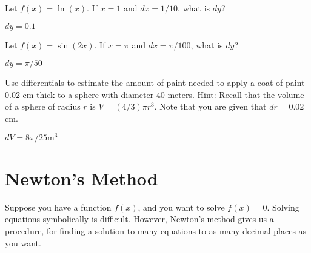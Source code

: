 \begin{exercises}
\begin{exercise} 
Let $f(x) = \ln(x)$. If $x=1$ and $dx =1/10$, what is $dy$?
\begin{answer} $dy=0.1$
\end{answer}\end{exercise}


\begin{exercise} 
Let $f(x) = \sin (2x)$. If $x=\pi$ and $dx=\pi/100$, what is $dy$?
\begin{answer} $dy=\pi/50$
\end{answer}\end{exercise}

\begin{exercise} Use differentials to estimate the amount of paint needed to
 apply a coat of paint 0.02 cm thick to a sphere with diameter $40$
 meters. Hint: Recall that the volume of a sphere of radius $r$ is $V
 =(4/3)\pi r^3$. Note that you are given that $dr=0.02$ cm.
\begin{answer} $dV=8\pi/25 \text{m}^3$
\end{answer}\end{exercise}

\end{exercises}













\section{Newton's Method}

Suppose you have a function $f(x)$, and you want to solve $f(x)=0$.
Solving equations symbolically is difficult. However, Newton's method
gives us a procedure, for finding a solution to many equations to as
many decimal places as you want.  


